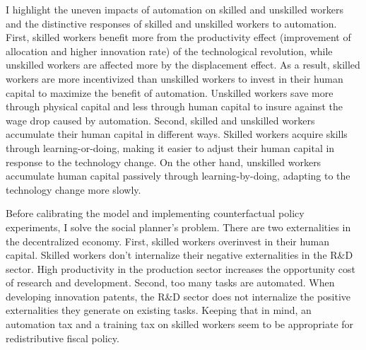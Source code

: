 \documentclass[12pt]{article}
\begin{document}
I highlight the uneven impacts of automation on skilled and unskilled workers and the distinctive responses of skilled and unskilled workers to automation. First, skilled workers benefit more from the productivity effect (improvement of allocation and higher innovation rate) of the technological revolution, while unskilled workers are affected more by the displacement effect. As a result, skilled workers are more incentivized than unskilled workers to invest in their human capital to maximize the benefit of automation. Unskilled workers save more through physical capital and less through human capital to insure against the wage drop caused by automation. Second, skilled and unskilled workers accumulate their human capital in different ways. Skilled workers acquire skills through learning-or-doing, making it easier to adjust their human capital in response to the technology change. On the other hand, unskilled workers accumulate human capital passively through learning-by-doing, adapting to the technology change more slowly.  

Before calibrating the model and implementing counterfactual policy experiments, I solve the social planner's problem. There are two externalities in the decentralized economy. First, skilled workers overinvest in their human capital. Skilled workers don't internalize their negative externalities in the R\&D sector. High productivity in the production sector increases the opportunity cost of research and development. Second, too many tasks are automated. When developing innovation patents, the R\&D sector does not internalize the positive externalities they generate on existing tasks. Keeping that in mind, an automation tax and a training tax on skilled workers seem to be appropriate for redistributive fiscal policy. 
\end{document}
